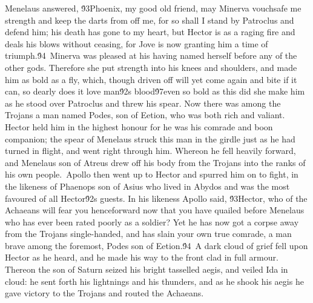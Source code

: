 {Menelaus answered, \'93Phoenix, my good old friend, may Minerva vouchsafe me strength and keep the darts from off me, for so shall I stand by Patroclus and defend him; his death has gone to my heart, but Hector is as a raging fire and deals his blows without ceasing, for Jove is now granting him a time of triumph.\'94\
Minerva was pleased at his having named herself before any of the other gods. Therefore she put strength into his knees and shoulders, and made him as bold as a fly, which, though driven off will yet come again and bite if it can, so dearly does it love man\'92s blood\'97even so bold as this did she make him as he stood over Patroclus and threw his spear. Now there was among the Trojans a man named Podes, son of Eetion, who was both rich and valiant. Hector held him in the highest honour for he was his comrade and boon companion; the spear of Menelaus struck this man in the girdle just as he had turned in flight, and went right through him. Whereon he fell heavily forward, and Menelaus son of Atreus drew off his body from the Trojans into the ranks of his own people.\
Apollo then went up to Hector and spurred him on to fight, in the likeness of Phaenops son of Asius who lived in Abydos and was the most favoured of all Hector\'92s guests. In his likeness Apollo said, \'93Hector, who of the Achaeans will fear you henceforward now that you have quailed before Menelaus who has ever been rated poorly as a soldier? Yet he has now got a corpse away from the Trojans single-handed, and has slain your own true comrade, a man brave among the foremost, Podes son of Eetion.\'94\
A dark cloud of grief fell upon Hector as he heard, and he made his way to the front clad in full armour. Thereon the son of Saturn seized his bright tasselled aegis, and veiled Ida in cloud: he sent forth his lightnings and his thunders, and as he shook his aegis he gave victory to the Trojans and routed the Achaeans.\
}
